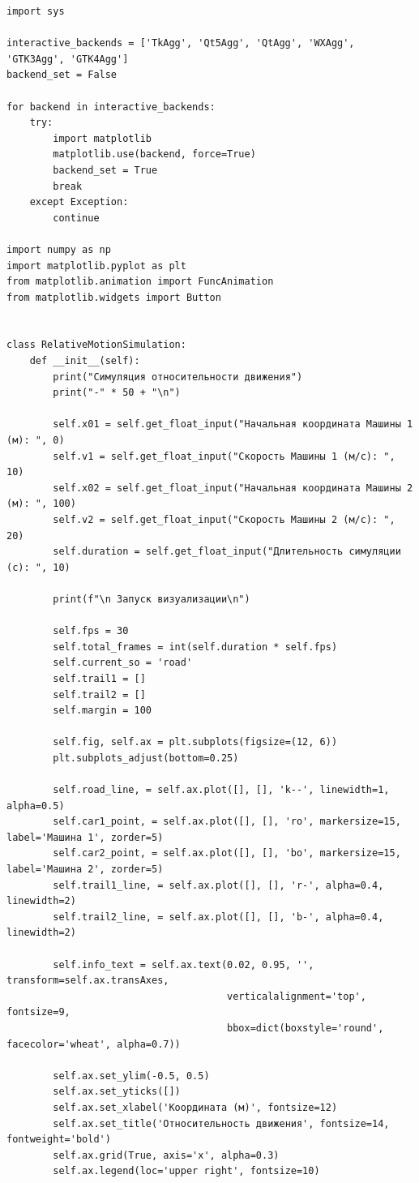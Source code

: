 \documentclass[12pt,a4paper]{article}
\begin{document}
\begin{lstlisting}[caption={Основной код симуляции (main.py)}, label={lst:main}]
import sys

interactive_backends = ['TkAgg', 'Qt5Agg', 'QtAgg', 'WXAgg', 'GTK3Agg', 'GTK4Agg']
backend_set = False

for backend in interactive_backends:
    try:
        import matplotlib
        matplotlib.use(backend, force=True)
        backend_set = True
        break
    except Exception:
        continue

import numpy as np
import matplotlib.pyplot as plt
from matplotlib.animation import FuncAnimation
from matplotlib.widgets import Button


class RelativeMotionSimulation:
    def __init__(self):
        print("Симуляция относительности движения")
        print("-" * 50 + "\n")

        self.x01 = self.get_float_input("Начальная координата Машины 1 (м): ", 0)
        self.v1 = self.get_float_input("Скорость Машины 1 (м/с): ", 10)
        self.x02 = self.get_float_input("Начальная координата Машины 2 (м): ", 100)
        self.v2 = self.get_float_input("Скорость Машины 2 (м/с): ", 20)
        self.duration = self.get_float_input("Длительность симуляции (с): ", 10)

        print(f"\n Запуск визуализации\n")

        self.fps = 30
        self.total_frames = int(self.duration * self.fps)
        self.current_so = 'road'
        self.trail1 = []
        self.trail2 = []
        self.margin = 100

        self.fig, self.ax = plt.subplots(figsize=(12, 6))
        plt.subplots_adjust(bottom=0.25)

        self.road_line, = self.ax.plot([], [], 'k--', linewidth=1, alpha=0.5)
        self.car1_point, = self.ax.plot([], [], 'ro', markersize=15, label='Машина 1', zorder=5)
        self.car2_point, = self.ax.plot([], [], 'bo', markersize=15, label='Машина 2', zorder=5)
        self.trail1_line, = self.ax.plot([], [], 'r-', alpha=0.4, linewidth=2)
        self.trail2_line, = self.ax.plot([], [], 'b-', alpha=0.4, linewidth=2)

        self.info_text = self.ax.text(0.02, 0.95, '', transform=self.ax.transAxes,
                                      verticalalignment='top', fontsize=9,
                                      bbox=dict(boxstyle='round', facecolor='wheat', alpha=0.7))

        self.ax.set_ylim(-0.5, 0.5)
        self.ax.set_yticks([])
        self.ax.set_xlabel('Координата (м)', fontsize=12)
        self.ax.set_title('Относительность движения', fontsize=14, fontweight='bold')
        self.ax.grid(True, axis='x', alpha=0.3)
        self.ax.legend(loc='upper right', fontsize=10)


\end{lstlisting}
\end{document}
